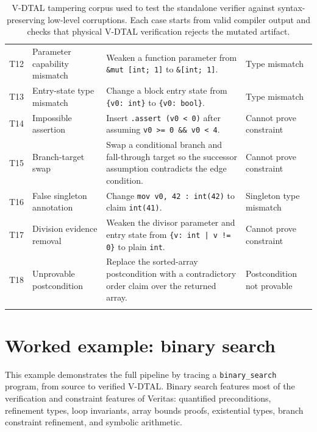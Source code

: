 \begin{table}[p]
\begin{tabular}{p{} p{} p{} p{}}
    T12 & Parameter capability mismatch
        & Weaken a function parameter from \texttt{\&mut [int; 1]} to \texttt{\&[int; 1]}.
        & Type mismatch \\
    T13 & Entry-state type mismatch
        & Change a block entry state from \texttt{\{v0: int\}} to \texttt{\{v0: bool\}}.
        & Type mismatch \\
    T14 & Impossible assertion
        & Insert \texttt{.assert (v0 < 0)} after assuming \texttt{v0 >= 0 \&\& v0 < 4}.
        & Cannot prove constraint \\
    T15 & Branch-target swap
        & Swap a conditional branch and fall-through target so the successor assumption contradicts the edge condition.
        & Cannot prove constraint \\
    T16 & False singleton annotation
        & Change \texttt{mov v0, 42 : int(42)} to claim \texttt{int(41)}.
        & Singleton type mismatch \\
    T17 & Division evidence removal
        & Weaken the divisor parameter and entry state from \texttt{\{v: int | v != 0\}} to plain \texttt{int}.
        & Cannot prove constraint \\
    T18 & Unprovable postcondition
        & Replace the sorted-array postcondition with a contradictory order claim over the returned array.
        & Postcondition not provable \\
    \tablehline
  \end{tabular}
  \caption{V-DTAL tampering corpus used to test the standalone verifier against syntax-preserving low-level corruptions. Each case starts from valid compiler output and checks that physical V-DTAL verification rejects the mutated artifact.}
  \label{tab:dtal-tampering-corpus}
\end{table}

\chapter{Worked example: binary search}\label{app:worked-example}

This example demonstrates the full pipeline by tracing a \texttt{binary\_search} program, from source to verified V-DTAL. Binary search features most of the verification and constraint features of Veritas: quantified preconditions, refinement types, loop invariants, array bounds proofs, existential types, branch constraint refinement, and symbolic arithmetic.

